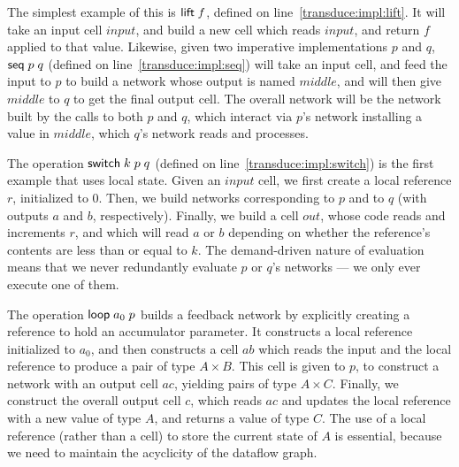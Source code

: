 \documentclass[preprint,natbib]{sigplanconf}
\begin{document}
The simplest example of this is $\mbox{\textsf{{lift}}}\; f$, defined on
line~\ref{transduce:impl:lift}. It will take an input cell $input$,
and build a new cell which reads $input$, and return $f$ applied to
that value. Likewise, given two imperative implementations $p$ and $q$,
$\mbox{\textsf{{seq}}}\; p\;q$ (defined on line~\ref{transduce:impl:seq}) will take
an input cell, and feed the input to $p$ to build a network whose
output is named $middle$, and will then give $middle$ to $q$ to get
the final output cell. The overall network will be the network built
by the calls to both $p$ and $q$, which interact via $p$'s network
installing a value in $middle$, which $q$'s network reads and processes.


The operation $\mbox{\textsf{{switch}}}\; k\;p\;q$ (defined on
line~\ref{transduce:impl:switch}) is the first example that uses local
state. Given an $input$ cell, we first create a local reference $r$,
initialized to $0$. Then, we build networks corresponding to $p$ and
to $q$ (with outputs $a$ and $b$, respectively). Finally, we build a cell
$out$, whose code reads and increments $r$, and which will read $a$ or
$b$ depending on whether the reference's contents are less than or
equal to $k$. The demand-driven nature of evaluation means
that we never redundantly evaluate $p$ or $q$'s networks --- we only
ever execute one of them.

The operation $\mbox{\textsf{{loop}}}\; a_0\;p$ builds a feedback network by
explicitly creating a reference to hold an accumulator parameter. It
constructs a local reference initialized to $a_0$, and then constructs
a cell $ab$ which reads the input and the local reference to produce a
pair of type $A \times B$. This cell is given to $p$, to construct a
network with an output cell $ac$, yielding pairs of type $A \times
C$. Finally, we construct the overall output cell $c$, which reads
$ac$ and updates the local reference with a new value of type $A$, and
returns a value of type $C$. The use of a local reference (rather than
a cell) to store the current state of $A$ is essential, because we need
to maintain the acyclicity of the dataflow graph. 
\end{document}

